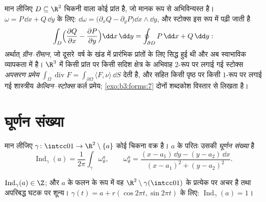 \begin{example}[शास्त्रीय प्रमेय]
\label{ex:b3:forms:classical}
मान लीजिए $D \subseteq \R^2$ चिकनी  वाला कोई  प्रांत है, जो मानक
रूप से अभिविन्यस्त है। $\omega = P\,\dd x +
Q\,\dd y$ के लिए: $\dd\omega = \bigl(\partial_xQ -
\partial_yP\bigr)\dd x\wedge\dd y$, और स्टोक्स इस रूप में
पढ़ी जाती है
\[
\int_D\Bigl(\frac{\partial Q}{\partial x} -
\frac{\partial P}{\partial y}\Bigr)\dd x\,\dd y
= \oint_{\partial D}P\,\dd x + Q\,\dd y :
\]
अर्थात् \emph{ग्रीन--रीमान}, जो दूसरे~वर्ष के खंड में प्रारंभिक
प्रांतों के लिए सिद्ध हुई थी और अब स्वाभाविक व्यापकता में है।
$\R^3$ में किसी  प्रांत पर किसी सदिश क्षेत्र के अभिवाह $2$-रूप
पर लगाई गई स्टोक्स \emph{अपसरण प्रमेय} $\int_\Omega\operatorname{div}F =
\int_{\partial\Omega}\langle F, \nu\rangle\,\dd S$ देती है, और 
सहित किसी पृष्ठ पर किसी $1$-रूप पर लगाई गई शास्त्रीय
\emph{केल्विन--स्टोक्स} कर्ल प्रमेय; \cref{exo:b3:forms:7} दोनों शब्दकोश विस्तार
से लिखता है।
\end{example}

\section{घूर्णन संख्या}\label{sec:b3:forms:winding}

\begin{definition}\label{def:b3:forms:winding}
मान लीजिए $\gamma\colon\intcc01\to\R^2\setminus\{a\}$ कोई चिकना  वक्र है। $a$ के परितः उसकी
\emph{घूर्णन संख्या} है
\[
\operatorname{Ind}_\gamma(a) =
\frac1{2\pi}\int_\gamma\omega_\theta^a,
\qquad
\omega_\theta^a = \frac{(x - a_1)\,\dd y - (y - a_2)\,\dd
x}{(x - a_1)^2 + (y - a_2)^2} .
\]
\end{definition}

\begin{proposition}\label{prop:b3:forms:windinginteger}
$\operatorname{Ind}_\gamma(a) \in \Z$; और $a$ के फलन के रूप में वह $\R^2\setminus\gamma(\intcc01)$ के प्रत्येक 
पर अचर है तथा अपरिबद्ध घटक पर शून्य। $\gamma(t) = a + r(\cos2\pi t, \sin2\pi t)$ के लिए: $\operatorname{Ind}_\gamma(a) = 1$।
\end{proposition}

